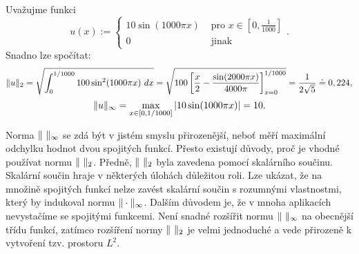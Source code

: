 
\begin{ex}
Uvažujme funkci
\[ u(x):=\begin{cases}10\sin(1000\pi x) & \mbox{ pro }x\in[0,\frac1{1000}]\\0 & \mbox{ jinak}\end{cases}. \]
Snadno lze spočítat:
\[
\|u\|_2 = \sqrt{\int_0^{1/1000}100\sin^2(1000\pi x)~dx}
= \sqrt{100\left[\frac{x}2-\frac{\sin(2000\pi x)}{4000\pi}\right]_{x=0}^{1/1000}}
= \frac1{2\sqrt{5}}\doteq 0,224,
\]
\[ \|u\|_\infty = \max_{x\in[0,1/1000]}|10\sin(1000\pi x)| = 10. \]
\end{ex}

Norma $\|\ \|_\infty$ se zdá být v jistém smyslu přirozenější, neboť měří maximální odchylku hodnot dvou spojitých funkcí.
Přesto existují důvody, proč je vhodné používat normu $\|\ \|_2$.
Předně, $\|\ \|_2$ byla zavedena pomocí skalárního součinu. Skalární součin hraje v některých úlohách důležitou roli.
Lze ukázat, že na množině spojitých funkcí nelze zavést skalární součin s rozumnými vlastnostmi, který by indukoval normu $\|\cdot\|_\infty$.
Dalším důvodem je, že v mnoha aplikacích nevystačíme se spojitými funkcemi. Není snadné rozšířit normu $\|\ \|_\infty$ na obecnější třídu funkcí, zatímco rozšíření normy $\|\ \|_2$ je velmi jednoduché a vede přirozeně k vytvoření tzv. prostoru $L^2$.





